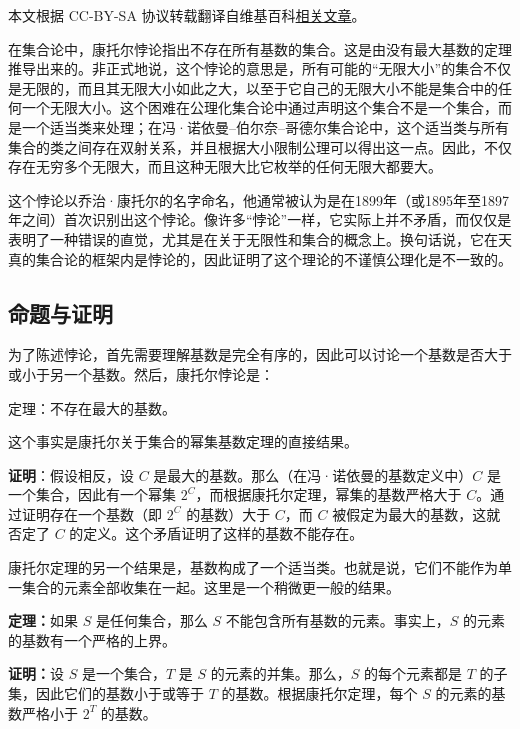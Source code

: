 
本文根据 CC-BY-SA 协议转载翻译自维基百科\href{https://en.wikipedia.org/wiki/Cantor\%27s_paradox}{相关文章}。

在集合论中，康托尔悖论指出不存在所有基数的集合。这是由没有最大基数的定理推导出来的。非正式地说，这个悖论的意思是，所有可能的“无限大小”的集合不仅是无限的，而且其无限大小如此之大，以至于它自己的无限大小不能是集合中的任何一个无限大小。这个困难在公理化集合论中通过声明这个集合不是一个集合，而是一个适当类来处理；在冯·诺依曼–伯尔奈–哥德尔集合论中，这个适当类与所有集合的类之间存在双射关系，并且根据大小限制公理可以得出这一点。因此，不仅存在无穷多个无限大，而且这种无限大比它枚举的任何无限大都要大。

这个悖论以乔治·康托尔的名字命名，他通常被认为是在1899年（或1895年至1897年之间）首次识别出这个悖论。像许多“悖论”一样，它实际上并不矛盾，而仅仅是表明了一种错误的直觉，尤其是在关于无限性和集合的概念上。换句话说，它在天真的集合论的框架内是悖论的，因此证明了这个理论的不谨慎公理化是不一致的。
\subsection{命题与证明}
为了陈述悖论，首先需要理解基数是完全有序的，因此可以讨论一个基数是否大于或小于另一个基数。然后，康托尔悖论是：

定理：不存在最大的基数。

这个事实是康托尔关于集合的幂集基数定理的直接结果。

\textbf{证明}：假设相反，设 $C$ 是最大的基数。那么（在冯·诺依曼的基数定义中）$C$ 是一个集合，因此有一个幂集 $2^C$，而根据康托尔定理，幂集的基数严格大于 $C$。通过证明存在一个基数（即 $2^C$ 的基数）大于 $C$，而 $C$ 被假定为最大的基数，这就否定了 $C$ 的定义。这个矛盾证明了这样的基数不能存在。

康托尔定理的另一个结果是，基数构成了一个适当类。也就是说，它们不能作为单一集合的元素全部收集在一起。这里是一个稍微更一般的结果。

\textbf{定理：}如果 $S$ 是任何集合，那么 $S$ 不能包含所有基数的元素。事实上，$S$ 的元素的基数有一个严格的上界。

\textbf{证明：}设 $S$ 是一个集合，$T$ 是 $S$ 的元素的并集。那么，$S$ 的每个元素都是 $T$ 的子集，因此它们的基数小于或等于 $T$ 的基数。根据康托尔定理，每个 $S$ 的元素的基数严格小于 $2^T$ 的基数。
